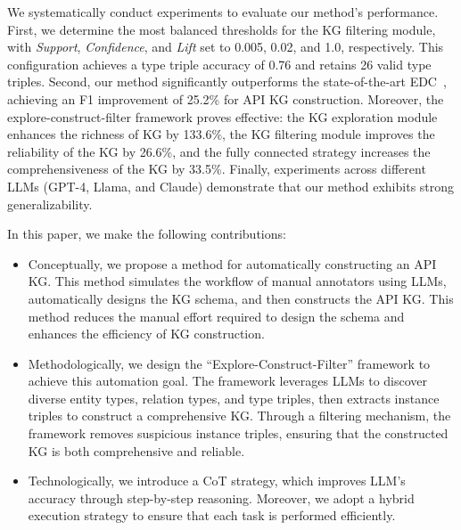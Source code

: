 We systematically conduct experiments to evaluate our method’s performance.
First, we determine the most balanced thresholds for the KG filtering module, with \textit{Support}, \textit{Confidence}, and \textit{Lift} set to 0.005, 0.02, and 1.0, respectively. 
This configuration achieves a type triple accuracy of 0.76 and retains 26 valid type triples.
Second, our method significantly outperforms the state-of-the-art EDC~\cite{EDC}, achieving an F1 improvement of 25.2\% for API KG construction.
Moreover, the explore-construct-filter framework proves effective: the KG exploration module enhances the richness of KG by 133.6\%, the KG filtering module improves the reliability of the KG by 26.6\%, and the fully connected strategy increases the comprehensiveness of the KG by 33.5\%.
Finally, experiments across different LLMs (GPT-4, Llama, and Claude) demonstrate that our method exhibits strong generalizability.

In this paper, we make the following contributions:
\begin{itemize}[leftmargin=*]
    \item 
    Conceptually, we propose a method for automatically constructing an API KG.
    This method simulates the workflow of manual annotators using LLMs, automatically designs the KG schema, and then constructs the API KG. This method reduces the manual effort required to design the schema and enhances the efficiency of KG construction.
    \item
    Methodologically, we design the ``Explore-Construct-Filter'' framework to achieve this automation goal.
    The framework leverages LLMs to discover diverse entity types, relation types, and type triples, then extracts instance triples to construct a comprehensive KG.
    Through a filtering mechanism, the framework removes suspicious instance triples, ensuring that the constructed KG is both comprehensive and reliable.
    \item
    Technologically, we introduce a CoT strategy, which improves LLM's accuracy through step-by-step reasoning.
    Moreover, we adopt a hybrid execution strategy to ensure that each task is performed efficiently.
\end{itemize}


